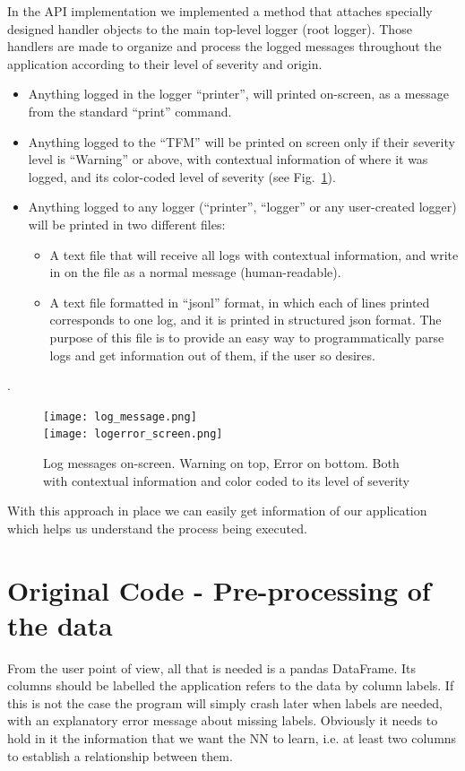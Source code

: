 \documentclass[a4paper, 11pt]{report}
\begin{document}
   In the API implementation we implemented a method that attaches specially designed handler objects to the main top-level logger (root logger). Those handlers are made to organize and process the logged messages throughout the application according to their level of severity and origin.
   \begin{itemize}
       \item Anything logged in the logger ``printer'', will printed on-screen, as a message from the standard ``print'' command.
       \item Anything logged to the ``TFM'' will be printed on screen only if their severity level is ``Warning'' or above, with contextual information of where it was logged, and its color-coded level of severity (see Fig.~\ref{fig:log_on_screen}).
       \item Anything logged to any logger (``printer'', ``logger'' or any user-created logger) will be printed in two different files:
       \begin{itemize}
           \item A text file that will receive all logs with contextual information, and write in on the file as a normal message (human-readable).
           \item A text file formatted in ``jsonl'' format, in which each of lines printed corresponds to one log, and it is printed in structured json format. The purpose of this file is to provide an easy way to programmatically parse logs and get information out of them, if the user so desires.
       \end{itemize}
   \end{itemize}.

   \begin{figure}[ht!]
        \centering
        \texttt{[image: log\_message.png]}\\
        \texttt{[image: logerror\_screen.png]}
        \caption[A screenshot of on-screen log messages]{Log messages on-screen. Warning on top, Error on bottom. Both with contextual information and color coded to its level of severity}
        \label{fig:log_on_screen}
   \end{figure}
   With this approach in place we can easily get information of our application which helps us understand the process being executed.


   \section{Original Code - Pre-processing of the data}\label{Implementation: Data preprocessing}
   From the user point of view, all that is needed is a pandas DataFrame. Its columns should be labelled the application refers to the data by column labels.  If this is not the case the program will simply crash later when labels are needed, with an explanatory error message about missing labels. Obviously it needs to hold in it the information that we want the NN to learn, i.e. at least two columns to establish a relationship between them.
\end{document}
